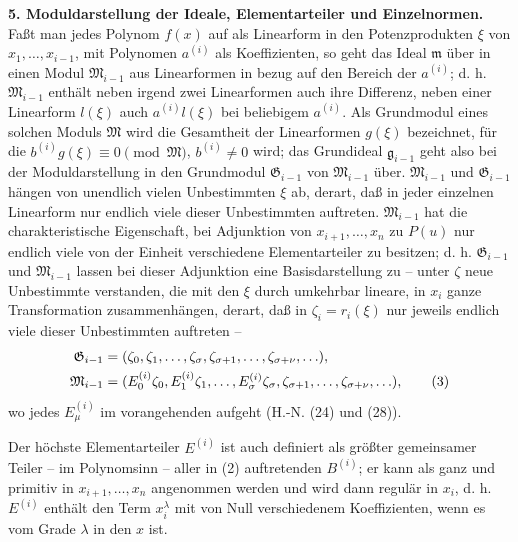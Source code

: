 \documentclass[11pt]{article}
\providecommand{\frakM}{\mathfrak M}
\providecommand{\frakG}{\mathfrak G}
\providecommand{\frakm}{\mathfrak m}
\providecommand{\frakg}{\mathfrak g}
\begin{document}
\textbf{5. Moduldarstellung der Ideale, Elementarteiler und Einzelnormen.} Faßt man jedes Polynom $f(x)$ auf als Linearform in den Potenzprodukten $\xi$ von $x_1,\ldots,x_{i-1}$, mit Polynomen $a^{(i)}$ als Koeffizienten, so geht das Ideal $\frakm$ über in einen Modul $\frakM_{i-1}$ aus Linearformen in bezug auf den Bereich der $a^{(i)}$; d. h. $\frakM_{i-1}$ enthält neben irgend zwei Linearformen auch ihre Differenz, neben einer Linearform $l(\xi)$ auch $a^{(i)}l(\xi)$ bei beliebigem $a^{(i)}$. Als Grundmodul eines solchen Moduls $\frakM$ wird die Gesamtheit der Linearformen $g(\xi)$ bezeichnet, für die $b^{(i)}g(\xi)\equiv0\pmod{\frakM}$, $b^{(i)}\ne0$ wird; das Grundideal $\frakg_{i-1}$ geht also bei der Moduldarstellung in den Grundmodul $\frakG_{i-1}$ von $\frakM_{i-1}$ über. $\frakM_{i-1}$ und $\frakG_{i-1}$ hängen von unendlich vielen Unbestimmten $\xi$ ab, derart, daß in jeder einzelnen Linearform nur endlich viele dieser Unbestimmten auftreten. $\frakM_{i-1}$ hat die charakteristische Eigenschaft, bei Adjunktion von $x_{i+1},\ldots,x_n$ zu $P(u)$ nur endlich viele von der Einheit verschiedene Elementarteiler zu besitzen; d. h. $\frakG_{i-1}$ und $\frakM_{i-1}$ lassen bei dieser Adjunktion eine Basisdarstellung zu -- unter $\zeta$ neue Unbestimmte verstanden, die mit den $\xi$ durch umkehrbar lineare, in $x_i$ ganze Transformation zusammenhängen, derart, daß in $\zeta_i=r_i(\xi)$ nur jeweils endlich viele dieser Unbestimmten auftreten --
\begin{align}
\frakG_{i-1}&=(\zeta_0,\zeta_1,\ldots,\zeta_\sigma,\zeta_{\sigma+1},\ldots,\zeta_{\sigma+\nu},\ldots), \notag\\
\frakM_{i-1}&=(E_0^{(i)}\zeta_0,E_1^{(i)}\zeta_1,\ldots,E_\sigma^{(i)}\zeta_\sigma,
\zeta_{\sigma+1},\ldots,\zeta_{\sigma+\nu},\ldots), \tag{3}
\end{align}
wo jedes $E_\mu^{(i)}$ im vorangehenden aufgeht (H.-N. (24) und (28)).

Der höchste Elementarteiler $E^{(i)}$ ist auch definiert als größter gemeinsamer Teiler -- im Polynomsinn -- aller in (2) auftretenden $B^{(i)}$; er kann als ganz und primitiv in $x_{i+1},\ldots,x_n$ angenommen werden und wird dann regulär in $x_i$, d. h. $E^{(i)}$ enthält den Term $x_i^\lambda$ mit von Null verschiedenem Koeffizienten, wenn es vom Grade $\lambda$ in den $x$ ist.
\end{document}

